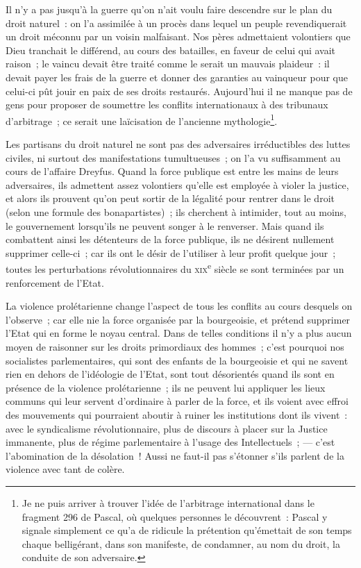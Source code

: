 \documentclass[french,twoside]{book} %
\begin{document}
Il n’y a pas jusqu’à la guerre qu’on n’ait voulu faire descendre sur le plan du droit naturel : on l’a assimilée à un procès dans lequel un peuple revendiquerait un droit méconnu par un voisin malfaisant. Nos pères admettaient volontiers que Dieu tranchait le différend, au cours des batailles, en faveur de celui qui avait raison ; le vaincu devait être traité comme le serait un mauvais plaideur : il devait payer les frais de la guerre et donner des garanties au vainqueur pour que celui-ci pût jouir en paix de ses droits restaurés. Aujourd’hui il ne manque pas de gens pour proposer de soumettre les conflits internationaux  à des tribunaux d’arbitrage ; ce serait une laïcisation de l’ancienne mythologie\footnote{ \noindent Je ne puis arriver à trouver l’idée de l’arbitrage international dans le fragment 296 de Pascal, où quelques personnes le découvrent : Pascal y signale simplement ce qu’a de ridicule la prétention qu’émettait de son temps chaque belligérant, dans son manifeste, de condamner, au nom du droit, la conduite de son adversaire.
 }.\par
Les partisans du droit naturel ne sont pas des adversaires irréductibles des luttes civiles, ni surtout des manifestations tumultueuses ; on l’a vu suffisamment au cours de l’affaire Dreyfus. Quand la force publique est entre les mains de leurs adversaires, ils admettent assez volontiers qu’elle est employée à violer la justice, et alors ils prouvent qu’on peut sortir de la légalité pour rentrer dans le droit (selon une formule des bonapartistes) ; ils cherchent à intimider, tout au moins, le gouvernement lorsqu’ils ne peuvent songer à le renverser. Mais quand ils combattent ainsi les détenteurs de la force publique, ils ne désirent nullement supprimer celle-ci ; car ils ont le désir de l’utiliser à leur profit quelque jour ; toutes les perturbations révolutionnaires du {\scshape xix}\textsuperscript{e} siècle se sont terminées par un renforcement de l’Etat.\par
La violence prolétarienne change l’aspect de tous les conflits au cours desquels on l’observe ; car elle nie la force organisée par la bourgeoisie, et prétend supprimer l’Etat qui en forme le noyau central. Dans de telles conditions il n’y a plus aucun moyen de raisonner sur les droits primordiaux des hommes ; c’est pourquoi nos socialistes parlementaires, qui sont des enfants de la bourgeoisie et qui ne savent rien en dehors de l’idéologie de l’Etat,  sont tout désorientés quand ils sont en présence de la violence prolétarienne ; ils ne peuvent lui appliquer les lieux communs qui leur servent d’ordinaire à parler de la force, et ils voient avec effroi des mouvements qui pourraient aboutir à ruiner les institutions dont ils vivent : avec le syndicalisme révolutionnaire, plus de discours à placer sur la Justice immanente, plus de régime parlementaire à l’usage des Intellectuels ; — c’est l’abomination de la désolation ! Aussi ne faut-il pas s’étonner s’ils parlent de la violence avec tant de colère.\par
\end{document}

